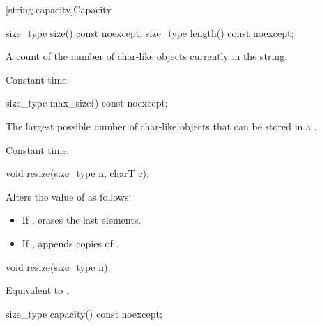 [string.capacity]{Capacity}

%
%
\begin{itemdecl}
size_type size() const noexcept;
size_type length() const noexcept;
\end{itemdecl}

\begin{itemdescr}
\pnum
\returns
A count of the number of char-like objects currently in the string.

\pnum
\complexity Constant time.
\end{itemdescr}

%
\begin{itemdecl}
size_type max_size() const noexcept;
\end{itemdecl}

\begin{itemdescr}
\pnum
\returns
The largest possible number of char-like objects that can be stored in a
.

\pnum
\complexity Constant time.
\end{itemdescr}

%
\begin{itemdecl}
void resize(size_type n, charT c);
\end{itemdecl}

\begin{itemdescr}
\pnum
\effects
Alters the value of
as follows:

\begin{itemize}
\item
If
,
erases the last  elements.
\item
If
,
appends  copies of .
\end{itemize}
\end{itemdescr}

%
\begin{itemdecl}
void resize(size_type n);
\end{itemdecl}

\begin{itemdescr}
\pnum
\effects
Equivalent to .
\end{itemdescr}

%
\begin{itemdecl}
size_type capacity() const noexcept;
\end{itemdecl}

